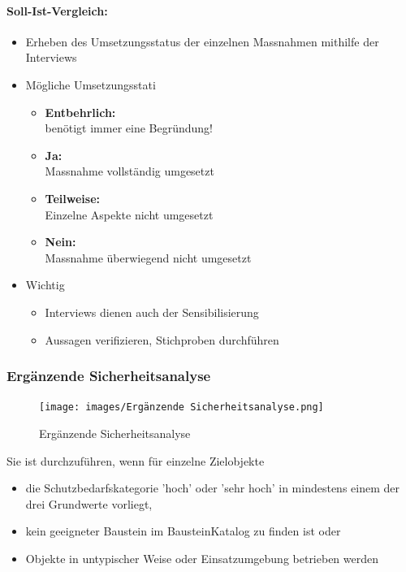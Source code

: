 \documentclass[10pt,a4paper]{article}
\begin{document}
\paragraph*{Soll-Ist-Vergleich:}
\begin{itemize}[noitemsep,topsep=0pt,leftmargin=*]
    \item Erheben des Umsetzungsstatus der einzelnen
    Massnahmen mithilfe der Interviews
    \item Mögliche Umsetzungsstati
    \begin{itemize}[noitemsep,topsep=0pt,leftmargin=*]
        \item \textbf{Entbehrlich:}\\benötigt immer eine Begründung!
        \item \textbf{Ja:}\\Massnahme vollständig umgesetzt
        \item \textbf{Teilweise:}\\Einzelne Aspekte nicht umgesetzt
        \item \textbf{Nein:}\\Massnahme überwiegend nicht umgesetzt
    \end{itemize}
    \item Wichtig
    \begin{itemize}[noitemsep,topsep=0pt,leftmargin=*]
        \item Interviews dienen auch der Sensibilisierung
        \item Aussagen verifizieren, Stichproben durchführen
    \end{itemize}
\end{itemize}

\subsubsection*{Ergänzende Sicherheitsanalyse}
\begin{figure}[H]
    \begin{center}
    \texttt{[image: images/Ergänzende Sicherheitsanalyse.png]}
    \caption{Ergänzende Sicherheitsanalyse}
    \label{Ergänzende Sicherheitsanalyse}
    \end{center}
\end{figure}

Sie ist durchzuführen, wenn für einzelne Zielobjekte
\begin{itemize}[noitemsep,topsep=0pt,leftmargin=*]
    \item die Schutzbedarfskategorie 'hoch' oder
    'sehr hoch' in mindestens einem der drei
    Grundwerte vorliegt,
    \item kein geeigneter Baustein im BausteinKatalog zu finden ist oder
    \item Objekte in untypischer Weise oder
    Einsatzumgebung betrieben werden
\end{itemize}
\end{document}
